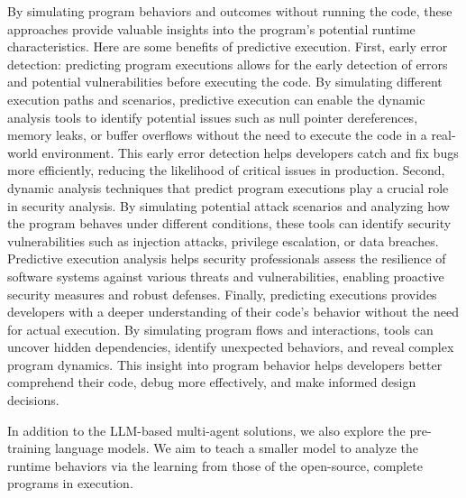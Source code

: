 By simulating program behaviors and outcomes without running the code,
these approaches provide valuable insights into the program's
potential runtime characteristics. Here are some benefits of
predictive execution. First, early error detection: predicting program
executions allows for the early detection of errors and potential
vulnerabilities before executing the code. By simulating different
execution paths and scenarios, predictive execution can enable the
dynamic analysis tools to identify potential issues such as null
pointer dereferences, memory leaks, or buffer overflows without the
need to execute the code in a real-world environment. This early error
detection helps developers catch and fix bugs more efficiently,
reducing the likelihood of critical issues in production. Second,
dynamic analysis techniques that predict program executions play a
crucial role in security analysis. By simulating potential attack
scenarios and analyzing how the program behaves under different
conditions, these tools can identify security vulnerabilities such as
injection attacks, privilege escalation, or data breaches. Predictive
execution analysis helps security professionals assess the resilience
of software systems against various threats and vulnerabilities,
enabling proactive security measures and robust defenses. Finally,
predicting executions provides developers with a deeper understanding
of their code's behavior without the need for actual execution. By
simulating program flows and interactions, tools can uncover hidden
dependencies, identify unexpected behaviors, and reveal complex
program dynamics. This insight into program behavior helps developers
better comprehend their code, debug more effectively, and make
informed design decisions.

In addition to the LLM-based multi-agent solutions, we also explore the
pre-training language models. We aim to teach a smaller model to analyze
the runtime behaviors via the learning from those of the open-source,
complete programs in execution.



